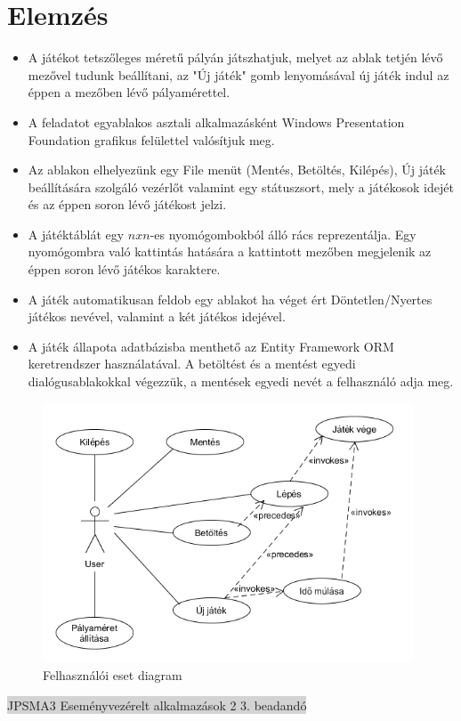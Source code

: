 \documentclass[11pt,a4paper]{article}
\begin{document}
\section{Elemzés}
\begin{itemize}
	\item A játékot tetszőleges méretű pályán játszhatjuk, melyet az ablak tetjén lévő
	mezővel tudunk beállítani, az "Új játék" gomb lenyomásával új játék indul az
	éppen a mezőben lévő pályamérettel.
	\item A feladatot egyablakos asztali alkalmazásként Windows Presentation Foundation grafikus felülettel
	valósítjuk meg.
	\item Az ablakon elhelyezünk egy File menüt (Mentés, Betöltés, Kilépés), Új játék
	beállítására szolgáló vezérlőt valamint egy státuszsort, mely a játékosok idejét és
	az éppen soron lévő játékost jelzi.
	\item A játéktáblát egy $nxn$-es nyomógombokból álló rács reprezentálja. Egy
	nyomógombra való kattintás hatására a kattintott mezőben megjelenik az éppen soron lévő játékos karaktere.
	\item A játék automatikusan feldob egy ablakot ha véget ért Döntetlen/Nyertes játékos
	nevével, valamint a két játékos idejével.
	\item A játék állapota adatbázisba menthető az Entity Framework ORM keretrendszer
	használatával. A betöltést és a mentést egyedi dialógusablakokkal végezzük, a mentések
	egyedi nevét a felhasználó adja meg.
\end{itemize}
\begin{figure}[h]
\centering
\includegraphics[width=11cm]{UMLs/UseCase.png}
\caption{Felhasználói eset diagram}
\end{figure}
\newpage
\thispagestyle{empty}
\begin{center}
\colorbox{lightgray}{{\large JPSMA3} \hspace{3cm} {\large Eseményvezérelt alkalmazások 2 3. beadandó} \hspace{5cm} \thepage}
\end{center}
\end{document}
